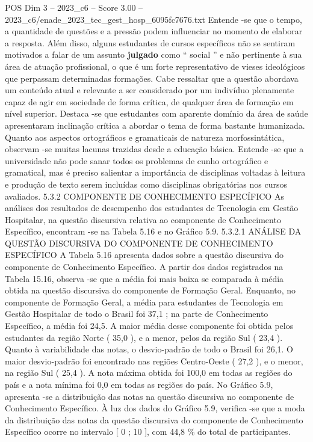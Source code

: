 \begin{textsample}{POS Dim 3 – 2023\_c6 – Score 3.00 – 2023\_c6/enade\_2023\_tec\_gest\_hosp\_6095fc7676.txt}
Entende -se que o tempo, a quantidade de questões e a pressão podem influenciar no momento de elaborar a resposta.
Além disso, alguns estudantes de cursos específicos não se sentiram motivados a falar de um assunto \textbf{julgado} como “ social ” e não pertinente à sua área de atuação profissional, o que é um forte representativo de vieses ideológicos que perpassam determinadas formações.
Cabe ressaltar que a questão abordava um conteúdo atual e relevante a ser considerado por um indivíduo plenamente capaz de agir em sociedade de forma crítica, de qualquer área de formação em nível superior.
Destaca -se que estudantes com aparente domínio da área de saúde apresentaram inclinação crítica a abordar o tema de forma bastante humanizada.
Quanto aos aspectos ortográficos e gramaticais de natureza morfossintática, observam -se muitas lacunas trazidas desde a educação básica.
Entende -se que a universidade não pode sanar todos os problemas de cunho ortográfico e gramatical, mas é preciso salientar a importância de disciplinas voltadas à leitura e produção de texto serem incluídas como disciplinas obrigatórias nos cursos avaliados. 5.3.2 COMPONENTE DE CONHECIMENTO ESPECÍFICO As análises dos resultados de desempenho dos estudantes de Tecnologia em Gestão Hospitalar, na questão discursiva relativa ao componente de Conhecimento Específico, encontram -se na Tabela 5.16 e no Gráfico 5.9. 5.3.2.1 ANÁLISE DA QUESTÃO DISCURSIVA DO COMPONENTE DE CONHECIMENTO ESPECÍFICO A Tabela 5.16 apresenta dados sobre a questão discursiva do componente de Conhecimento Específico.
A partir dos dados registrados na Tabela 15.16, observa -se que a média foi mais baixa se comparada à média obtida na questão discursiva do componente de Formação Geral.
Enquanto, no componente de Formação Geral, a média para estudantes de Tecnologia em Gestão Hospitalar de todo o Brasil foi 37,1 ; na parte de Conhecimento Específico, a média foi 24,5.
A maior média desse componente foi obtida pelos estudantes da região Norte ( 35,0 ), e a menor, pelos da região Sul ( 23,4 ).
Quanto à variabilidade das notas, o desvio-padrão de todo o Brasil foi 26,1.
O maior desvio-padrão foi encontrado nas regiões Centro-Oeste ( 27,2 ), e o menor, na região Sul ( 25,4 ).
A nota máxima obtida foi 100,0 em todas as regiões do país e a nota mínima foi 0,0 em todas as regiões do país.
No Gráfico 5.9, apresenta -se a distribuição das notas na questão discursiva no componente de Conhecimento Específico.
À luz dos dados do Gráfico 5.9, verifica -se que a moda da distribuição das notas da questão discursiva do componente de Conhecimento Específico ocorre no intervalo [ 0 ; 10 ], com 44,8 \% do total de participantes.

\end{textsample}
